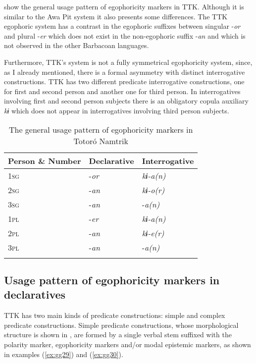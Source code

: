 \documentclass[output=paper]{langsci/langscibook}
\begin{document}
 show the general usage pattern of egophoricity markers in TTK. Although it is similar to the Awa Pit system it also presents some differences. The TTK egophoric system has a contrast in the egophoric suffixes between singular -\textit{or} and plural -\textit{er} which does not exist in the non-egophoric suffix -\textit{an} and which is not observed in the other Barbacoan languages.

Furthermore, TTK’s system is not a fully symmetrical egophoricity system, since, as I already mentioned, there is a formal asymmetry with distinct interrogative constructions. TTK has two different predicate interrogative constructions, one for first and second person and another one for third person. In interrogatives involving first and second person subjects there is an obligatory copula auxiliary \textit{kɨ} which does not appear in interrogatives involving third person subjects.

\begin{table}
\begin{tabularx}{\textwidth}{XXl}
\lsptoprule
\textbf{Person \& Number} & \textbf{Declarative} & \textbf{Interrogative}\\
\midrule
1\textsc{sg} & -\textit{or} & \textit{kɨ-a(n)}\\
2\textsc{sg} & -\textit{an} & \textit{kɨ-o(r)}\\
3\textsc{sg} & -\textit{an} & -\textit{a(n)}\\
\hline
1\textsc{pl} & -\textit{er} & \textit{kɨ-a(n)}\\
2\textsc{pl} & -\textit{an} & \textit{kɨ-e(r)}\\
3\textsc{pl} & -\textit{an} & -\textit{a(n)}\\
\lspbottomrule
\end{tabularx}
\caption{The general usage pattern of egophoricity markers in Totoró Namtrik}
\label{tab:gg7}
\end{table}


 


\subsection{Usage pattern of egophoricity markers in declaratives}\label{s:gg3-1}

TTK has two main kinds of predicate constructions: simple and complex predicate constructions. Simple predicate constructions, whose morphological structure is shown in , are formed by a single verbal stem suffixed with the polarity marker, egophoricity markers and/or modal epistemic markers, as shown in examples (\ref{ex:gg29}) and (\ref{ex:gg30}).
\end{document}
